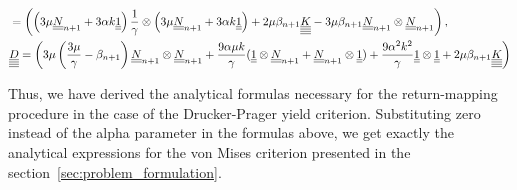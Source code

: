 \documentclass[12pt]{article}
\begin{document}
\begin{appendices}
\begin{align*}
        & = \left( \left( 3\mu \underline{\underline{N}}_{n+1} + 3\alpha k \underline{\underline{1}} \right) \frac{1}{\gamma} \otimes \left( 3\mu \underline{\underline{N}}_{n+1} + 3\alpha k \underline{\underline{1}} \right) + 2\mu\beta_{n+1}\underline{\underline{\underline{\underline{K}}}} - 3\mu\beta_{n+1}\underline{\underline{N}}_{n+1} \otimes \underline{\underline{N}}_{n+1} \right), \\
        & \underline{\underline{\underline{\underline{D}}}} = \left( 3\mu\left(\frac{3\mu}{\gamma} - \beta_{n+1}\right)\underline{\underline{N}}_{n+1} \otimes \underline{\underline{N}}_{n+1} + \frac{9\alpha\mu k}{\gamma} (\underline{\underline{1}} \otimes \underline{\underline{N}}_{n+1} + \underline{\underline{N}}_{n+1} \otimes \underline{\underline{1}}) + \frac{9\alpha^2k^2}{\gamma} \underline{\underline{1}} \otimes \underline{\underline{1}} + 2\mu\beta_{n+1} \underline{\underline{\underline{\underline{K}}}} \right)
    \end{align*}

    Thus, we have derived the analytical formulas necessary for the return-mapping procedure in the case of the Drucker-Prager yield criterion. Substituting zero instead of the alpha parameter in the formulas above, we get exactly the analytical expressions for the von Mises criterion presented in the section~\ref{sec:problem_formulation}.
\end{appendices}
\end{document}
